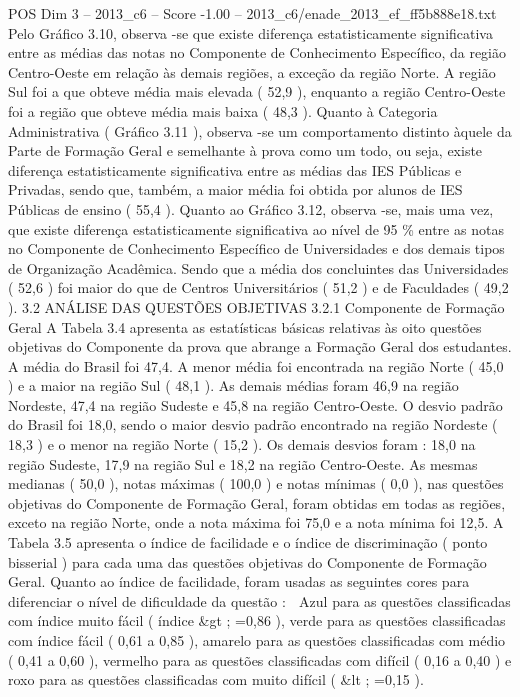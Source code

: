 \begin{textsample}{POS Dim 3 – 2013\_c6 – Score -1.00 – 2013\_c6/enade\_2013\_ef\_ff5b888e18.txt}
Pelo Gráfico 3.10, observa -se que existe diferença estatisticamente significativa entre as médias das notas no Componente de Conhecimento Específico, da região Centro-Oeste em relação às demais regiões, a exceção da região Norte.
A região Sul foi a que obteve média mais elevada ( 52,9 ), enquanto a região Centro-Oeste foi a região que obteve média mais baixa ( 48,3 ).
Quanto à Categoria Administrativa ( Gráfico 3.11 ), observa -se um comportamento distinto àquele da Parte de Formação Geral e semelhante à prova como um todo, ou seja, existe diferença estatisticamente significativa entre as médias das IES Públicas e Privadas, sendo que, também, a maior média foi obtida por alunos de IES Públicas de ensino ( 55,4 ).
Quanto ao Gráfico 3.12, observa -se, mais uma vez, que existe diferença estatisticamente significativa ao nível de 95 \% entre as notas no Componente de Conhecimento Específico de Universidades e dos demais tipos de Organização Acadêmica.
Sendo que a média dos concluintes das Universidades ( 52,6 ) foi maior do que de Centros Universitários ( 51,2 ) e de Faculdades ( 49,2 ). 3.2 ANÁLISE DAS QUESTÕES OBJETIVAS 3.2.1 Componente de Formação Geral A Tabela 3.4 apresenta as estatísticas básicas relativas às oito questões objetivas do Componente da prova que abrange a Formação Geral dos estudantes.
A média do Brasil foi 47,4.
A menor média foi encontrada na região Norte ( 45,0 ) e a maior na região Sul ( 48,1 ).
As demais médias foram 46,9 na região Nordeste, 47,4 na região Sudeste e 45,8 na região Centro-Oeste.
O desvio padrão do Brasil foi 18,0, sendo o maior desvio padrão encontrado na região Nordeste ( 18,3 ) e o menor na região Norte ( 15,2 ).
Os demais desvios foram : 18,0 na região Sudeste, 17,9 na região Sul e 18,2 na região Centro-Oeste.
As mesmas medianas ( 50,0 ), notas máximas ( 100,0 ) e notas mínimas ( 0,0 ), nas questões objetivas do Componente de Formação Geral, foram obtidas em todas as regiões, exceto na região Norte, onde a nota máxima foi 75,0 e a nota mínima foi 12,5.
A Tabela 3.5 apresenta o índice de facilidade e o índice de discriminação ( ponto bisserial ) para cada uma das questões objetivas do Componente de Formação Geral.
Quanto ao índice de facilidade, foram usadas as seguintes cores para diferenciar o nível de dificuldade da questão :  Azul para as questões classificadas com índice muito fácil ( índice \&gt ; =0,86 ), verde para as questões classificadas com índice fácil ( 0,61 a 0,85 ), amarelo para as questões classificadas com médio ( 0,41 a 0,60 ), vermelho para as questões classificadas com difícil ( 0,16 a 0,40 ) e roxo para as questões classificadas com muito difícil ( \&lt ; =0,15 ).

\end{textsample}
